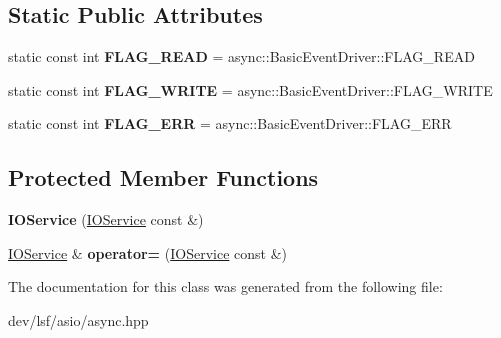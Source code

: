 \subsection*{Static Public Attributes}
\begin{DoxyCompactItemize}
\item 
\hypertarget{classlsf_1_1asio_1_1IOService_afb05c1b261e1718e3567989ba995ddee}{
static const int {\bfseries FLAG\_\-READ} = async::BasicEventDriver::FLAG\_\-READ}
\label{classlsf_1_1asio_1_1IOService_afb05c1b261e1718e3567989ba995ddee}

\item 
\hypertarget{classlsf_1_1asio_1_1IOService_a3f4c0b9420386fe3a2c55b4873f0d783}{
static const int {\bfseries FLAG\_\-WRITE} = async::BasicEventDriver::FLAG\_\-WRITE}
\label{classlsf_1_1asio_1_1IOService_a3f4c0b9420386fe3a2c55b4873f0d783}

\item 
\hypertarget{classlsf_1_1asio_1_1IOService_af1e67e6626eb87a669db15538e9a8e9f}{
static const int {\bfseries FLAG\_\-ERR} = async::BasicEventDriver::FLAG\_\-ERR}
\label{classlsf_1_1asio_1_1IOService_af1e67e6626eb87a669db15538e9a8e9f}

\end{DoxyCompactItemize}
\subsection*{Protected Member Functions}
\begin{DoxyCompactItemize}
\item 
\hypertarget{classlsf_1_1asio_1_1IOService_a4733d5afe2c1233cf2ed0edeaa100abd}{
{\bfseries IOService} (\hyperlink{classlsf_1_1asio_1_1IOService}{IOService} const \&)}
\label{classlsf_1_1asio_1_1IOService_a4733d5afe2c1233cf2ed0edeaa100abd}

\item 
\hypertarget{classlsf_1_1asio_1_1IOService_a12ed35d6b137443d22ca1f7f65416b6e}{
\hyperlink{classlsf_1_1asio_1_1IOService}{IOService} \& {\bfseries operator=} (\hyperlink{classlsf_1_1asio_1_1IOService}{IOService} const \&)}
\label{classlsf_1_1asio_1_1IOService_a12ed35d6b137443d22ca1f7f65416b6e}

\end{DoxyCompactItemize}


The documentation for this class was generated from the following file:\begin{DoxyCompactItemize}
\item 
dev/lsf/asio/async.hpp\end{DoxyCompactItemize}
